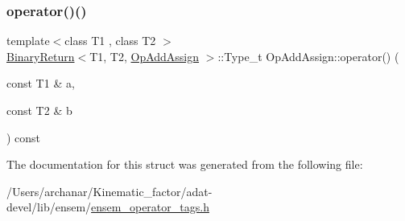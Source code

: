 \subsubsection{\texorpdfstring{operator()()}{operator()()}\hspace{0.1cm}{\footnotesize\ttfamily [3/3]}}
{\footnotesize\ttfamily template$<$class T1 , class T2 $>$ \\
\mbox{\hyperlink{structBinaryReturn}{Binary\+Return}}$<$T1, T2, \mbox{\hyperlink{structOpAddAssign}{Op\+Add\+Assign}} $>$\+::Type\+\_\+t Op\+Add\+Assign\+::operator() (\begin{DoxyParamCaption}\item[{const T1 \&}]{a,  }\item[{const T2 \&}]{b }\end{DoxyParamCaption}) const\hspace{0.3cm}{\ttfamily [inline]}}



The documentation for this struct was generated from the following file\+:\begin{DoxyCompactItemize}
\item 
/\+Users/archanar/\+Kinematic\+\_\+factor/adat-\/devel/lib/ensem/\mbox{\hyperlink{adat-devel_2lib_2ensem_2ensem__operator__tags_8h}{ensem\+\_\+operator\+\_\+tags.\+h}}\end{DoxyCompactItemize}
